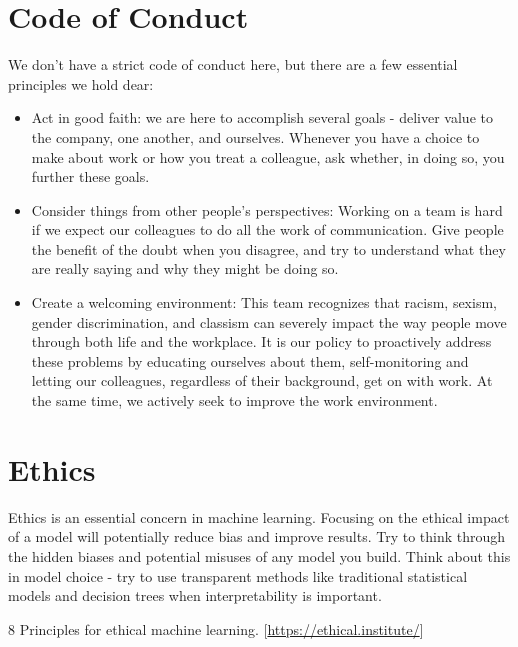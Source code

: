 \documentclass[
  11pt,
]{book}
\providecommand{\tightlist}{%
  \setlength{\itemsep}{0pt}\setlength{\parskip}{0pt}}
\begin{document}
\hypertarget{code-of-conduct}{%
\section{Code of Conduct}\label{code-of-conduct}}

We don't have a strict code of conduct here, but there are a few essential principles we hold dear:

\begin{itemize}
\tightlist
\item
  Act in good faith: we are here to accomplish several goals - deliver value to the company, one another, and ourselves. Whenever you have a choice to make about work or how you treat a colleague, ask whether, in doing so, you further these goals.
\item
  Consider things from other people's perspectives: Working on a team is hard if we expect our colleagues to do all the work of communication. Give people the benefit of the doubt when you disagree, and try to understand what they are really saying and why they might be doing so.
\item
  Create a welcoming environment: This team recognizes that racism, sexism, gender discrimination, and classism can severely impact the way people move through both life and the workplace. It is our policy to proactively address these problems by educating ourselves about them, self-monitoring and letting our colleagues, regardless of their background, get on with work. At the same time, we actively seek to improve the work environment.
\end{itemize}

\hypertarget{ethics}{%
\section{Ethics}\label{ethics}}

Ethics is an essential concern in machine learning. Focusing on the ethical impact of a model will potentially reduce bias and improve results. Try to think through the hidden biases and potential misuses of any model you build. Think about this in model choice - try to use transparent methods like traditional statistical models and decision trees when interpretability is important.

8 Principles for ethical machine learning.
{[}\url{https://ethical.institute/}{]}
\end{document}
